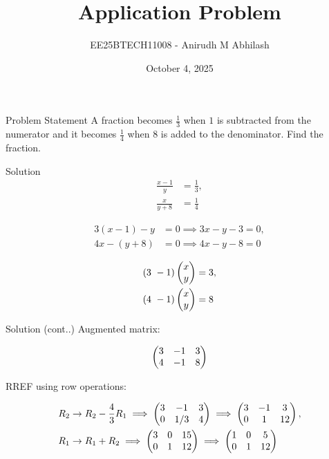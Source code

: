 \documentclass{beamer}
\title{Application Problem}
\author{EE25BTECH11008 - Anirudh M Abhilash}
\date{October 4, 2025}
\begin{document}
\begin{frame}
\titlepage
\end{frame}

\begin{frame}{Problem Statement}
A fraction becomes $\frac{1}{3}$ when $1$ is subtracted from the numerator and it becomes $\frac{1}{4}$ when $8$ is added to the denominator. Find the fraction.
\end{frame}

\begin{frame}{Solution}
\begin{align}
\frac{x-1}{y} &= \frac{1}{3}, \\
\frac{x}{y+8} &= \frac{1}{4}
\end{align}

\begin{align}
3(x-1) - y &= 0 \implies 3x - y - 3 = 0, \\
4x - (y+8) &= 0 \implies 4x - y - 8 = 0
\end{align}

\begin{align}
(3 \ -1) \begin{pmatrix}x \\ y\end{pmatrix} &= 3, \\
(4 \ -1) \begin{pmatrix}x \\ y\end{pmatrix} &= 8
\end{align}
\end{frame}

\begin{frame}{Solution (cont..)}
Augmented matrix:

\begin{align}
\begin{pmatrix}3 & -1 & 3 \\ 4 & -1 & 8\end{pmatrix}
\end{align}

RREF using row operations:

\begin{align}
R_2 &\to R_2 - \frac{4}{3} R_1 \implies 
\begin{pmatrix}3 & -1 & 3 \\ 0 & 1/3 & 4\end{pmatrix} \implies
\begin{pmatrix}3 & -1 & 3 \\ 0 & 1 & 12\end{pmatrix}, \\
R_1 &\to R_1 + R_2 \implies 
\begin{pmatrix}3 & 0 & 15 \\ 0 & 1 & 12\end{pmatrix} \implies
\begin{pmatrix}1 & 0 & 5 \\ 0 & 1 & 12\end{pmatrix}
\end{align}
\end{frame}
\end{document}
